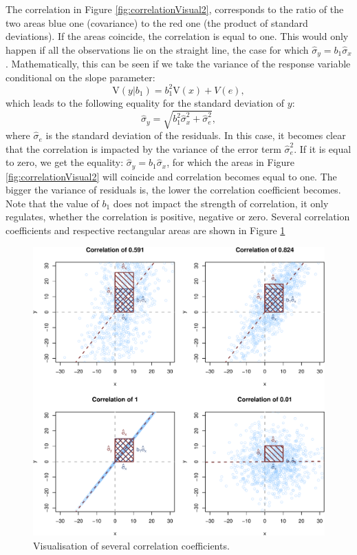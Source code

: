 \documentclass[
]{book}
\theoremstyle{definition}
\theoremstyle{definition}
\theoremstyle{definition}
\theoremstyle{definition}
\theoremstyle{remark}
\begin{document}
The correlation in Figure \ref{fig:correlationVisual2}, corresponds to the ratio of the two areas blue one (covariance) to the red one (the product of standard deviations). If the areas coincide, the correlation is equal to one. This would only happen if all the observations lie on the straight line, the case for which \(\hat{\sigma}_y = b_1 \hat{\sigma}_x\). Mathematically, this can be seen if we take the variance of the response variable conditional on the slope parameter:
\begin{equation}
    \mathrm{V}(y | b_1) = b_1^2 \mathrm{V}(x) + V(e),
    \label{eq:varianceForCorrelation}
\end{equation}
which leads to the following equality for the standard deviation of \(y\):
\begin{equation}
    \hat{\sigma}_y = \sqrt{b_1^2 \hat{\sigma}_x^2 + \hat{\sigma}_e^2} ,
    \label{eq:sdForCorrelation}
\end{equation}
where \(\hat{\sigma}_e\) is the standard deviation of the residuals. In this case, it becomes clear that the correlation is impacted by the variance of the error term \(\hat{\sigma}_e^2\). If it is equal to zero, we get the equality: \(\hat{\sigma}_y = b_1 \hat{\sigma}_x\), for which the areas in Figure \ref{fig:correlationVisual2} will coincide and correlation becomes equal to one. The bigger the variance of residuals is, the lower the correlation coefficient becomes. Note that the value of \(b_1\) does not impact the strength of correlation, it only regulates, whether the correlation is positive, negative or zero. Several correlation coefficients and respective rectangular areas are shown in Figure \ref{fig:correlationVisual3}

\begin{figure}
\centering
\includegraphics{Svetunkov---Statistics-for-Business-Analytics_files/figure-latex/correlationVisual3-1.pdf}
\caption{\label{fig:correlationVisual3}Visualisation of several correlation coefficients.}
\end{figure}
\end{document}
